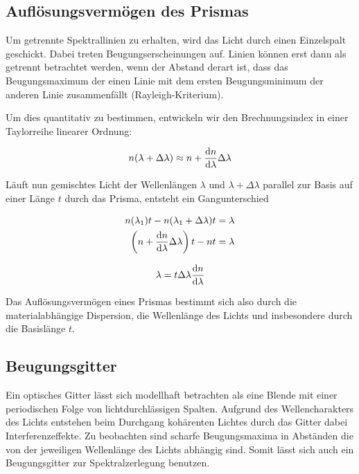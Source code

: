 \documentclass[a4paper,german,12pt,smallheadings]{scrartcl}
\begin{document}
\subsection{Auflösungsvermögen des Prismas}

Um getrennte Spektrallinien zu erhalten, wird das Licht durch einen Einzelspalt
geschickt. Dabei treten Beugungserscheinungen auf. Linien können erst dann als
getrennt betrachtet werden, wenn der Abstand derart ist, dass das
Beugungsmaximum der einen Linie mit dem ersten Beugungsminimum der anderen
Linie zusammenfällt (Rayleigh-Kriterium).

Um dies quantitativ zu bestimmen, entwickeln wir den Brechnungsindex in einer
Taylorreihe linearer Ordnung:

\begin{equation}
  n(\lambda + \Delta \lambda) \approx n + \frac{\dif n}{\dif \lambda} \Delta \lambda
\end{equation}

Läuft nun gemischtes Licht der Wellenlängen $\lambda$ und $\lambda + \Delta
\lambda$ parallel zur Basis auf einer Länge $t$ durch das Prisma, entsteht ein
Gangunterschied

\begin{align}
  n(\lambda_1) t - n(\lambda_1 + \Delta \lambda) t &= \lambda \\
  \del{ n + \frac{\dif n}{\dif \lambda} \Delta \lambda}t - nt &= \lambda
\end{align}

\begin{equation}
  \lambda = t \Delta \lambda \frac{\dif n}{\dif \lambda}
\end{equation}

Das Auflösungsvermögen eines Prismas bestimmt sich also durch die
materialabhängige Dispersion, die Wellenlänge des Lichts und insbesondere durch
die Basislänge $t$.

\subsection{Beugungsgitter}

Ein optisches Gitter lässt sich modellhaft betrachten als eine Blende mit einer
periodischen Folge von lichtdurchlässigen Spalten. Aufgrund des
Wellencharakters des Lichts entstehen beim Durchgang kohärenten Lichtes durch
das Gitter dabei Interferenzeffekte. Zu beobachten sind scharfe Beugungsmaxima
in Abständen die von der jeweiligen Wellenlänge des Lichts abhängig sind. Somit
lässt sich auch ein Beugungsgitter zur Spektralzerlegung benutzen.
\end{document}

